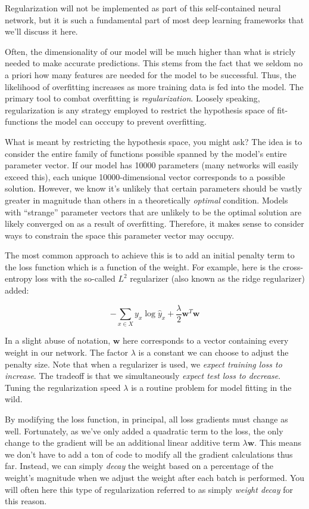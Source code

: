 \documentclass[
]{article}
\begin{document}
Regularization will not be implemented as part of this self-contained
neural network, but it is such a fundamental part of most deep learning
frameworks that we'll discuss it here.

Often, the dimensionality of our model will be much higher than what is
stricly needed to make accurate predictions. This stems from the fact
that we seldom no a priori how many features are needed for the model to
be successful. Thus, the likelihood of overfitting increases as more
training data is fed into the model. The primary tool to combat
overfitting is \emph{regularization}. Loosely speaking, regularization
is any strategy employed to restrict the hypothesis space of
fit-functions the model can occcupy to prevent overfitting.

What is meant by restricting the hypothesis space, you might ask? The
idea is to consider the entire family of functions possible spanned by
the model's entire parameter vector. If our model has 10000 parameters
(many networks will easily exceed this), each unique 10000-dimensional
vector corresponds to a possible solution. However, we know it's
unlikely that certain parameters should be vastly greater in magnitude
than others in a theoretically \emph{optimal} condition. Models with
``strange'' parameter vectors that are unlikely to be the optimal
solution are likely converged on as a result of overfitting. Therefore,
it makes sense to consider ways to constrain the space this parameter
vector may occupy.

The most common approach to achieve this is to add an initial penalty
term to the loss function which is a function of the weight. For
example, here is the cross-entropy loss with the so-called \(L^2\)
regularizer (also known as the ridge regularizer) added:

\[-\sum_{x\in X} y_x \log{\hat{y}_x} + \frac{\lambda}{2} \mathbf{w}^{T}\mathbf{w}\]

In a slight abuse of notation, \(\mathbf{w}\) here corresponds to a
vector containing every weight in our network. The factor \(\lambda\) is
a constant we can choose to adjust the penalty size. Note that when a
regularizer is used, we \emph{expect training loss to increase}. The
tradeoff is that we simultaneously \emph{expect test loss to decrease}.
Tuning the regularization speed \(\lambda\) is a routine problem for
model fitting in the wild.

By modifying the loss function, in principal, all loss gradients must
change as well. Fortunately, as we've only added a quadratic term to the
loss, the only change to the gradient will be an additional linear
additive term \(\lambda\mathbf{w}\). This means we don't have to add a
ton of code to modify all the gradient calculations thus far. Instead,
we can simply \emph{decay} the weight based on a percentage of the
weight's magnitude when we adjust the weight after each batch is
performed. You will often here this type of regularization referred to
as simply \emph{weight decay} for this reason.
\end{document}
